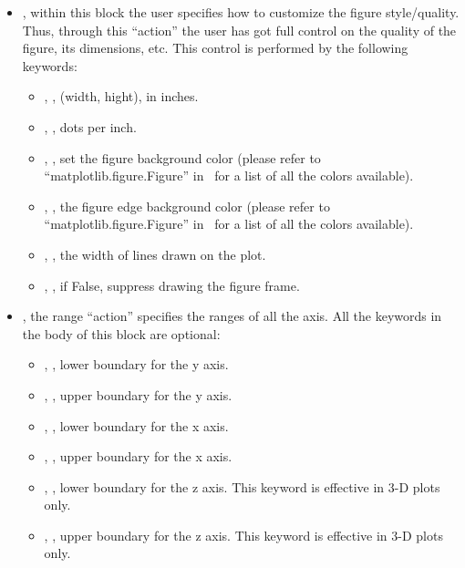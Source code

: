 \begin{itemize}
  \item {}, within this block the user specifies how
  to customize the figure style/quality.
  Thus, through this ``action'' the user has got full control on the quality of
  the figure, its dimensions, etc.
  This control is performed by the following keywords:
  \begin{itemize}
    \item {}, , (width, hight), in
    inches.
    \item {}, , dots per inch.
    \item {}, , set the figure background color
    (please refer to ``matplotlib.figure.Figure'' in~\cite{MatPlotLib} for a
    list of all the colors available).
    \item {}, , the figure edge background
    color (please refer to ``matplotlib.figure.Figure'' in~\cite{MatPlotLib} for
    a list of all the colors available).
    \item {}, , the width of lines drawn on the
    plot.
    \item {}, , if False, suppress drawing the
    figure frame.
  \end{itemize}
  \item {}, the range ``action'' specifies the ranges of all the
  axis.
  All the keywords in the body of this block are optional:
  \begin{itemize}
    \item {}, , lower boundary for the
    y axis.
    \item {}, , upper boundary for the
    y axis.
    \item {}, , lower boundary for the
    x axis.
    \item {}, , upper boundary for the
    x axis.
    \item {}, , lower boundary for the
    z axis.
    \nb This keyword is effective in 3-D plots only.
    \item {}, , upper boundary for the
    z axis.
    \nb This keyword is effective in 3-D plots only.
  \end{itemize}

\end{itemize}
